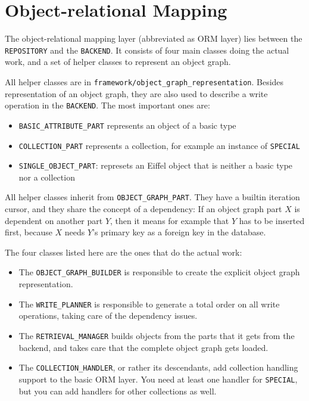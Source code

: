 \documentclass[a4paper,12pt]{report}
\begin{document}
\chapter{Object-relational Mapping}
\label{section:ORM}

The object-relational mapping layer (abbreviated as ORM layer) lies between the \lstinline!REPOSITORY! and the \lstinline!BACKEND!.
It consists of four main classes doing the actual work, and a set of helper classes to represent an object graph.

All helper classes are in \lstinline!framework/object_graph_representation!.
Besides representation of an object graph, they are also used to describe a write operation in the \lstinline!BACKEND!.
The most important ones are:

\begin{itemize}
 \item \lstinline!BASIC_ATTRIBUTE_PART! represents an object of a basic type
 \item \lstinline!COLLECTION_PART! represents a collection, for example an instance of \lstinline!SPECIAL!
 \item \lstinline!SINGLE_OBJECT_PART!: represets an Eiffel object that is neither a basic type nor a collection
\end{itemize}

All helper classes inherit from \lstinline!OBJECT_GRAPH_PART!. 
They have a built\-in iteration cursor, and they share the concept of a dependency:
If an object graph part $X$ is dependent on another part $Y$, then it means for example that $Y$ has to be inserted first, because $X$ needs $Y$'s primary key as a foreign key in the database.

The four classes listed here are the ones that do the actual work:

\begin{itemize}
 \item The \lstinline!OBJECT_GRAPH_BUILDER! is responsible to create the explicit object graph representation.
 \item The \lstinline!WRITE_PLANNER! is responsible to generate a total order on all write operations, taking care of the dependency issues.
 \item The \lstinline!RETRIEVAL_MANAGER! builds objects from the parts that it gets from the backend, and takes care that the complete object graph gets loaded.
 \item The \lstinline!COLLECTION_HANDLER!, or rather its descendants, add collection handling support to the basic ORM layer. 
 You need at least one handler for \lstinline!SPECIAL!, but you can add handlers for other collections as well.
\end{itemize}
\end{document}

